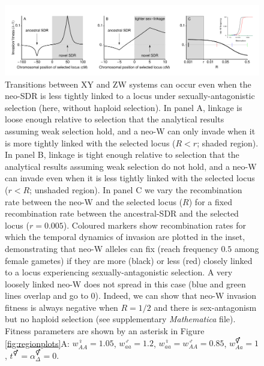 \documentclass[12pt]{article}
\begin{document}
\begin{figure}[!h]
\centering
\centerline{\includegraphics[width=1.5\linewidth]{PositionPlot_SexAntagTighter}}
\caption{
Transitions between XY and ZW systems can occur even when the neo-SDR is less tightly linked to a locus under sexually-antagonistic selection (here, without haploid selection).
In panel A, linkage is loose enough relative to selection that the analytical results assuming weak selection hold, and a neo-W can only invade when it is more tightly linked with the selected locus ($R<r$; shaded region).
In panel B, linkage is tight enough relative to selection that the analytical results assuming weak selection do not hold, and a neo-W can invade even when it is less tightly linked with the selected locus ($r<R$; unshaded region).
In panel C we vary the recombination rate between the neo-W and the selected locus ($R$) for a fixed recombination rate between the ancestral-SDR and the selected locus ($r=0.005$). 
Coloured markers show recombination rates for which the temporal dynamics of invasion are plotted in the inset, demonstrating that neo-W alleles can fix (reach frequency $0.5$ among female gametes) if they are more (black) or less (red) closely linked to a locus experiencing sexually-antagonistic selection. 
A very loosely linked neo-W does not spread in this case (blue and green lines overlap and go to 0). 
Indeed, we can show that neo-W invasion fitness is always negative when $R=1/2$ and there is sex-antagonism but no haploid selection (see supplementary \textit{Mathematica} file). 
Fitness parameters are shown by an asterisk in Figure \ref{fig:regionplots}A: $w_{AA}^\female = 1.05$, $w_{aa}^\male = 1.2$, $w_{aa}^\female = w_{AA}^\male = 0.85$, $w_{Aa}^\Hermaphrodite = 1$,  $t^\Hermaphrodite = \alpha^\Hermaphrodite_\Delta = 0$.
}
\label{fig:SexAntagTighter}
\end{figure}
\end{document}
